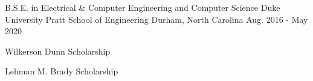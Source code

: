 

\begin{cventries}

  \cventry
    {B.S.E. in Electrical \& Computer Engineering and Computer Science} %
    {Duke University Pratt School of Engineering} %
    {Durham, North Carolina} %
    {Aug. 2016 - May 2020} %
    {
      \begin{cvitems} %
        \item {Wilkerson Dunn Scholarship}
        \item {Lehman M. Brady Scholarship}
      \end{cvitems}
    }

\end{cventries}
